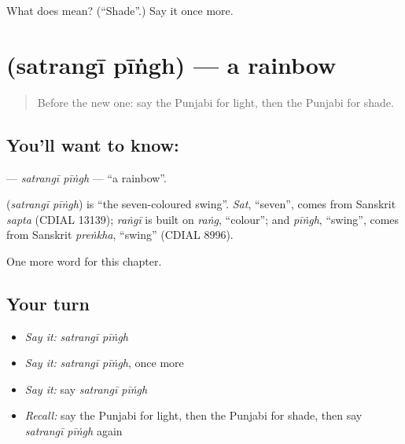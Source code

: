 \begin{tcolorbox}[breakable,colback=teal!4,colframe=teal!35!black,title={Before you move on}]
What does  mean? (\textquotedblleft{}Shade\textquotedblright{}.) Say it once more.
\end{tcolorbox}
\section[\texorpdfstring{\pa{ਸਤਰੰਗੀ} \pa{ਪੀਂਘ} (satrangī pīṅgh)}{ਸਤਰੰਗੀ ਪੀਂਘ (satrangī pīṅgh)}]{  (satrangī pīṅgh) — a rainbow}

\label{lesson:PA-C129-satrangipingh}



\begin{quote}
Before the new one: say the Punjabi for light, then the Punjabi for shade.
\end{quote}

\subsection*{You'll want to know:  }
\textbf{ } — \emph{satrangī pīṅgh} — \textquotedblleft{}a rainbow\textquotedblright{}.

\begin{cousinweb}
\textbf{ } (\emph{satrangī pīṅgh}) is \textquotedblleft{}the seven-coloured swing\textquotedblright{}. \emph{Sat}, \textquotedblleft{}seven\textquotedblright{}, comes from Sanskrit \emph{sapta} (CDIAL 13139); \emph{raṅgī} is built on \emph{raṅg}, \textquotedblleft{}colour\textquotedblright{}; and \emph{pīṅgh}, \textquotedblleft{}swing\textquotedblright{}, comes from Sanskrit \emph{preṅkha}, \textquotedblleft{}swing\textquotedblright{} (CDIAL 8996).
\end{cousinweb}

\begin{grammarlens}[title={What you've built}]
One more word for this chapter.
\end{grammarlens}

\subsection*{Your turn}
\begin{itemize}
\raggedright
  \item \emph{Say it:} \emph{satrangī pīṅgh}
  \item \emph{Say it:} \emph{satrangī pīṅgh}, once more
  \item \emph{Say it:} say \emph{satrangī pīṅgh}
  \item \emph{Recall:} say the Punjabi for light, then the Punjabi for shade, then say \emph{satrangī pīṅgh} again
\end{itemize}

